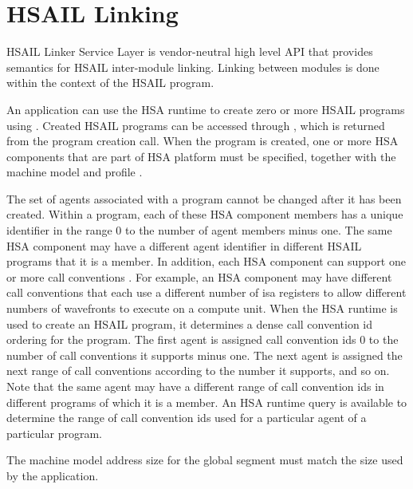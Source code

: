\documentclass[final]{book}
\begin{document}
\section{HSAIL Linking}\label{linking}

HSAIL Linker Service Layer is vendor-neutral high level API that provides
semantics for HSAIL inter-module linking. Linking between modules is done within
the context of the HSAIL program.

An application can use the HSA runtime to create zero or more HSAIL programs
using . Created HSAIL programs can be accessed
through , which is returned from the program
creation call.  When the program is created, one or more HSA components
 that are part of HSA platform must be specified, together
with the machine model  and profile
.

The set of agents associated with a program cannot be changed after it has been
created. Within a program, each of these HSA component members has a unique
identifier  in the range 0 to the number of
agent members minus one. The same HSA component may have a different agent
identifier in different HSAIL programs that it is a member. In addition, each
HSA component can support one or more call conventions
. For example, an HSA component
may have different call conventions that each use a different number of isa
registers to allow different numbers of wavefronts to execute on a compute unit.
When the HSA runtime is used to create an HSAIL program, it determines a dense
call convention id ordering for the program. The first agent is assigned call
convention ids 0 to the number of call conventions it supports minus one.  The
next agent is assigned the next range of call conventions according to the
number it supports, and so on. Note that the same agent may have a different
range of call convention ids in different programs of which it is a member. An
HSA runtime query  is available to
determine the range of call convention ids used for a particular agent of a
particular program.

The machine model address size for the global segment must match the size used
by the application.
\end{document}
